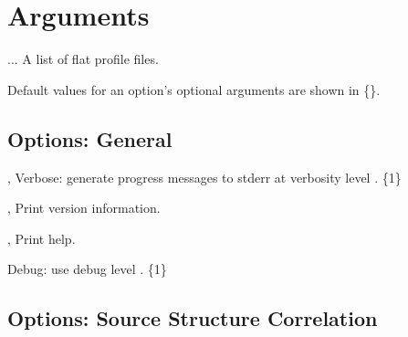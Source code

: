 \documentclass[english]{article}
\begin{document}
\section{Arguments}

\begin{Description}
\item[\Arg{profile-file}...] A list of flat profile files.
\end{Description}

Default values for an option's optional arguments are shown in \{\}.

\subsection{Options: General}

\begin{Description}
\item[\OptoArg{-v}{n}, \OptoArg{--verbose}{n}] Verbose: generate progress messages to stderr at verbosity level .  \{1\} 
\item[\Opt{-V}, \Opt{--version}] Print version information.
\item[\Opt{-h}, \Opt{--help}] Print help.
\item[\OptoArg{--debug}{n}]   Debug: use debug level . \{1\}
\end{Description}

\subsection{Options: Source Structure Correlation}
\end{document}
